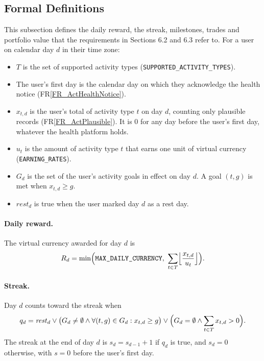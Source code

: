 \documentclass[12pt]{article}
\newcommand{\rref}[1]{FR\ref{#1}}
\begin{document}
\subsection{Formal Definitions} \label{SecFormal}

This subsection defines the daily reward, the streak, milestones, trades and
portfolio value that the requirements in Sections 6.2 and 6.3 refer to. For a user on
calendar day $d$ in their time zone:
\begin{itemize}
\item $T$ is the set of supported activity types
  (\texttt{SUPPORTED\_ACTIVITY\_\allowbreak TYPES}).
\item The user's first day is the calendar day on which they acknowledge the
  health notice (\rref{FR_ActHealthNotice}).
\item $x_{t,d}$ is the user's total of activity type $t$ on day $d$, counting
  only plausible records (\rref{FR_ActPlausible}). It is 0 for any day before
  the user's first day, whatever the health platform holds.
\item $u_t$ is the amount of activity type $t$ that earns one unit of virtual
  currency (\texttt{EARNING\_RATES}).
\item $G_d$ is the set of the user's activity goals in effect on day $d$. A
  goal $(t, g)$ is met when $x_{t,d} \geq g$.
\item $\mathit{rest}_d$ is true when the user marked day $d$ as a rest day.
\end{itemize}

\paragraph{Daily reward.} The virtual currency awarded for day $d$ is
\begin{equation}
R_d = \min\Bigl(\text{\texttt{MAX\_DAILY\_CURRENCY}},\
  \sum_{t \in T} \Bigl\lfloor \frac{x_{t,d}}{u_t} \Bigr\rfloor\Bigr).
\end{equation}

\paragraph{Streak.} Day $d$ counts toward the streak when
\begin{equation}
q_d = \mathit{rest}_d \lor \bigl(G_d \neq \emptyset \land
  \forall (t, g) \in G_d : x_{t,d} \geq g\bigr) \lor
  \Bigl(G_d = \emptyset \land \sum_{t \in T} x_{t,d} > 0\Bigr).
\end{equation}
The streak at the end of day $d$ is $s_d = s_{d-1} + 1$ if $q_d$ is true,
and $s_d = 0$ otherwise, with $s = 0$ before the user's first day.
\end{document}

